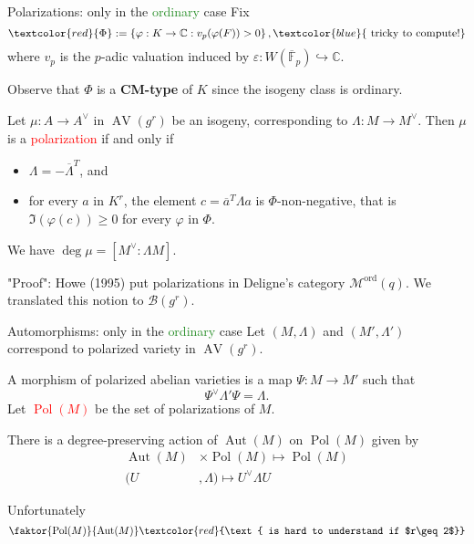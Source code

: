\documentclass[usenames,dvipsnames]{beamer}
\def\C{\mathbb{C}}
\def\F{\mathbb{F}}
\DeclareMathOperator{\AV}{AV}
\DeclareMathOperator{\Pol}{Pol}
\DeclareMathOperator{\Aut}{Aut}
\newcommand{\cB}{{\mathcal B}}
\newcommand{\cM}{{\mathcal M}}
\newcommand{\vphi}{\varphi}
\newcommand{\set}[1]{\left\lbrace#1\right\rbrace }
\newcommand{\Modord}[1]{\cM^{\text{ord}}({#1})}
\newcommand{\red}[1]{\textcolor{red}{#1}}
\newcommand{\blue}[1]{\textcolor{blue}{#1}}
\newcommand{\green}[1]{\textcolor{ForestGreen}{#1}}
\begin{document}
\begin{frame}{ Polarizations: only in the \green{ordinary} case }
Fix
\[ \red{ \Phi }:=\set{ \vphi:K \to \C : v_p(\vphi(F))>0 }, \blue{\text{ tricky to compute!}} \]
where $v_p$ is the $p$-adic valuation induced by $\varepsilon: W(\overline{\F}_p)\hookrightarrow \C$.

\pause Observe that $\Phi$ is a \textbf{CM-type} of $K$ since the isogeny class is ordinary.

\pause
\begin{theorem}
 Let $\mu:A\to A^\vee$ in $\AV(g^r)$ be an isogeny, corresponding to $\Lambda:M\to M^\vee$.
 \pause Then $\mu$ is a \red{polarization} if and only if
 \begin{itemize}
  \item $\Lambda = -\overline\Lambda^T$, and
  \item for every $a$ in $K^r$, the element
    $c=\overline a^T \Lambda a $
    is $\Phi$-non-negative, that is $\Im(\vphi(c)) \geq 0$ for every $\vphi$ in $\Phi$.
 \end{itemize}
 \pause We have $\deg \mu = [M^\vee : \Lambda M]$.
\end{theorem}

\pause "Proof": Howe (1995) put polarizations in Deligne's category $\Modord{q}$. We translated this notion to $\cB(g^r)$. 
\end{frame}

\begin{frame}{ Automorphisms: only in the \green{ordinary} case }
Let $(M,\Lambda)$ and $(M',\Lambda')$ correspond to polarized variety in $\AV(g^r)$.

\pause A morphism of polarized abelian varieties is a map $\Psi:M \to M'$ such that
\[ \Psi^\vee\Lambda'\Psi = \Lambda. \]
\pause Let \red{$\Pol(M)$} be the set of polarizations of $M$.
\pause
\begin{theorem}
There is a degree-preserving action of $\Aut(M)$ on $\Pol(M)$ given by
\begin{align*}
\Aut(M) & \times \Pol(M) \longmapsto \Pol(M)\\
(U &, \Lambda) \longmapsto U^\vee \Lambda U
\end{align*}
\end{theorem}
\pause Unfortunately
\[ \faktor{\Pol(M)}{\Aut(M)} \red{\text{ is hard to understand if $r\geq 2$}} \]
\end{frame}
\end{document}
